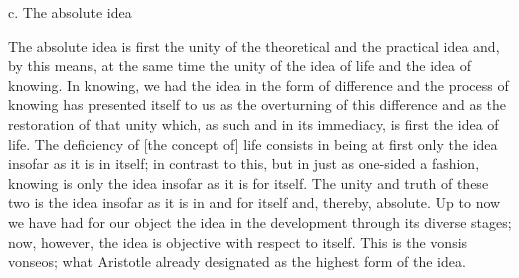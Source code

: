 c. The absolute idea

The absolute idea is first the unity of the theoretical and the practical idea and,
by this means, at the same time the unity of the idea of life and the idea of knowing.
In knowing, we had the idea in the form of difference and
the process of knowing has presented itself to us as the overturning of
this difference and as the restoration of that unity which,
as such and in its immediacy, is first the idea of life.
The deficiency of [the concept of] life consists
in being at first only the idea insofar as it is in itself;
in contrast to this, but in just as one-sided a fashion,
knowing is only the idea insofar as it is for itself.
The unity and truth of these two is the idea insofar as
it is in and for itself and, thereby, absolute.
Up to now we have had for our object
the idea in the development through its diverse stages;
now, however, the idea is objective with respect to itself.
This is the vonsis vonseos; what Aristotle already designated as the highest form of the idea.


